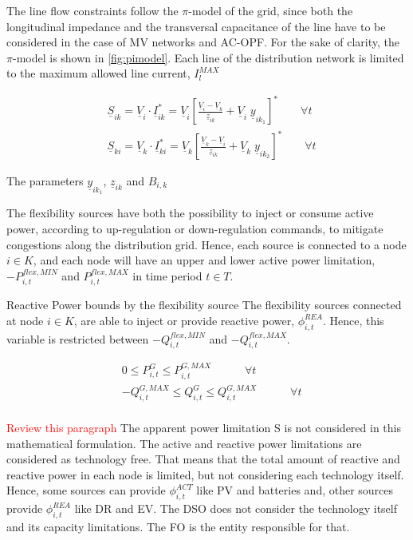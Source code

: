 The line flow constraints follow the $\pi$-model of the grid, since both the longitudinal impedance and the transversal capacitance of the line have to be considered in the case of MV networks and AC-OPF. For the sake of clarity, the $\pi$-model is shown in \ref{fig:pimodel}. Each line of the distribution network is limited to the maximum allowed line current, $I_{l}^{MAX}$


\begin{subequations}
\begin{align*}
& \underline{S}_{ik} = \underline{V}_{i} \cdot \underline{I}_{ik}^{*} = \underline{V}_{i} \left[ \frac{\underline{V}_{i} - \underline{V}_{k}}{\underline{z}_{ik}} + \underline{V}_{i} \; \underline{y}_{ik_1} \right]^{*}   \qquad  \forall t  \\
& \underline{S}_{ki} = \underline{V}_{k} \cdot \underline{I}_{ki}^{*} = \underline{V}_{k} \left[ \frac{\underline{V}_{k} - \underline{V}_{i}}{\underline{z}_{ik}} + \underline{V}_{k} \;  \underline{y}_{ik_2} \right]^{*}   \qquad  \forall t  
\end{align*}
\end{subequations}

The parameters $\underline{y}_{ik_1}$,  $\underline{z}_{ik}$ and $B_{i,k}$

The flexibility sources have both the possibility to inject or consume active power, according to up-regulation or down-regulation commands, to mitigate congestions along the distribution grid. Hence, each source is connected to a node $i \in K$, and each node will have an upper and lower active power limitation, $-P_{i,t}^{flex,MIN}$ and $P_{i,t}^{flex,MAX}$  in time period $t \in T$.

Reactive Power bounds by the flexibility source
The flexibility sources connected at node $i \in K$, are able to inject or provide reactive power, $\phi_{i,t}^{REA}$. Hence, this variable is restricted between $-Q_{i,t}^{flex,MIN}$ and $-Q_{i,t}^{flex,MAX}$.

\begin{subequations}
\begin{align*}
&  0 \leq P_{i,t}^{G} \leq P_{i,t}^{G,MAX}  \quad   \qquad  \forall t  \\
&  - Q_{i,t}^{G,MAX} \leq Q_{i,t}^{G} \leq Q_{i,t}^{G,MAX}  \quad   \qquad  \forall t \\
\end{align*}
\end{subequations}

\textcolor{red}{Review this paragraph}
The apparent power limitation S is not considered in this mathematical formulation. The active and reactive power limitations are considered as technology free. That means that the total amount of reactive and reactive power in each node is limited, but not considering each technology itself. Hence, some sources can provide $\phi_{i,t}^{ACT}$ like PV and  batteries and, other sources provide $\phi_{i,t}^{REA}$ like DR and EV. The DSO does not consider the technology itself and its capacity limitations. The FO is the entity  responsible for that. 

